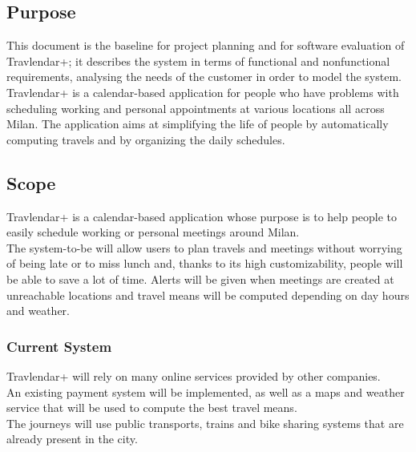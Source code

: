 \subsection{Purpose}
This document is the baseline for project planning and for software evaluation of Travlendar+; it describes the system in terms of functional and nonfunctional requirements, analysing the needs of the customer in order to model the system. \\
Travlendar+ is a calendar-based application for people who have problems with scheduling working and personal appointments at various locations all across Milan. The application aims at simplifying the life of people by automatically computing travels and by organizing the daily schedules.

\subsection{Scope}
Travlendar+ is a calendar-based application whose purpose is to help people to easily schedule working or personal meetings around Milan.\\
The system-to-be will allow users to plan travels and meetings without worrying of being late or to miss lunch and, thanks to its high customizability, people will be able to save a lot of time. Alerts will be given when meetings are created at unreachable locations and travel means will be computed depending on day hours and weather.

\subsubsection{Current System}
Travlendar+ will rely on many online services provided by other companies.\\
An existing payment system will be implemented, as well as a maps and weather service that will be used to compute the best travel means.\\
The journeys will use public transports, trains and bike sharing systems that are already present in the city.



